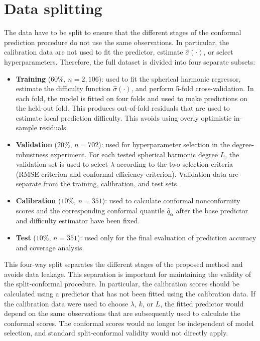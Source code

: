 \section{Data splitting}

The data have to be split to ensure that the different stages of the conformal prediction procedure do not use the same observations. In particular, the calibration data are not used to fit the predictor, estimate $\hat{\sigma}(\cdot)$, or select hyperparameters. Therefore, the full dataset is divided into four separate subsets:

\begin{itemize}
\item \textbf{Training} ($60\%$, $n=2{,}106$): used to fit the spherical harmonic regressor, estimate the difficulty function $\hat{\sigma}(\cdot)$, and perform 5-fold cross-validation. In each fold, the model is fitted on four folds and used to make predictions on the held-out fold. This produces out-of-fold residuals that are used to estimate local prediction difficulty. This avoids using overly optimistic in-sample residuals.

\item \textbf{Validation} ($20\%$, $n=702$): used for hyperparameter selection in the degree-robustness experiment. For each tested spherical harmonic degree $L$, the validation set is used to select $\lambda$ according to the two selection criteria (RMSE criterion and conformal-efficiency criterion). Validation data are separate from the training, calibration, and test sets. 

\item \textbf{Calibration} ($10\%$, $n=351$): used to calculate conformal nonconformity scores and the corresponding conformal quantile $\hat{q}_{\alpha}$ after the base predictor and difficulty estimator have been fixed.

\item \textbf{Test} ($10\%$, $n=351$): used only for the final evaluation of prediction accuracy and coverage analysis.

\end{itemize}
 
This four-way split separates the different stages of the proposed method and avoids data leakage. This separation is important for maintaining the validity of the split-conformal procedure. In particular, the calibration scores should be calculated using a predictor that has not been fitted using the calibration data. If the calibration data were used to choose $\lambda$, $k$, or $L$, the fitted predictor would depend on the same observations that are subsequently used to calculate the conformal scores. The conformal scores would no longer be independent of model selection, and standard split-conformal validity would not directly apply.

